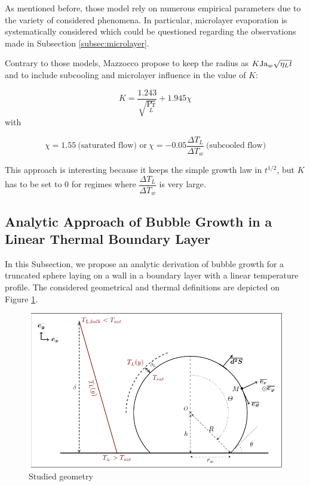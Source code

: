\begin{remark*}{}
As mentioned before, those model rely on numerous empirical parameters due to the variety of considered phenomena. In particular, microlayer evaporation is systematically considered which could be questioned regarding the observations made in Subsection \ref{subsec:microlayer}.
\end{remark*}

\npar

Contrary to those models, Mazzocco \etal \cite{mazzocco_reassessed_2018} propose to keep the radius as $K\mathrm{Ja}_{w}\sqrt{\eta_{L}t}$ and to include subcooling and microlayer influence in the value of $K$:

\begin{equation}
K = \frac{1.243}{\sqrt{\Pr_{L}}} + 1.945 \chi
\label{eq:Kgrowth_mazzocco}
\end{equation}
with

\begin{equation}
\chi = 1.55\ \text{(saturated flow) or}\ \chi = -0.05 \frac{\Delta T_{L}}{\Delta T_{w}}\ \text{(subcooled flow)}
\end{equation}

\begin{remark*}{}
This approach is interesting because it keeps the simple growth law in $t^{1/2}$, but $K$ has to be set to 0 for regimes where $\dfrac{\Delta T_{L}}{\Delta T_{w}}$ is very large.%
\end{remark*}


\subsection{Analytic Approach of Bubble Growth in a Linear Thermal Boundary Layer}

In this Subsection, we propose an analytic derivation of bubble growth for a truncated sphere laying on a wall in a boundary layer with a linear temperature profile. The considered geometrical and thermal definitions are depicted on Figure \ref{fig:anal_growth}.


\begin{figure}[h!]
\centering
\includegraphics[width=0.7\linewidth]{img/growth/growth_analytical.pdf}
\caption{Studied geometry}
\label{fig:anal_growth}
\end{figure}

